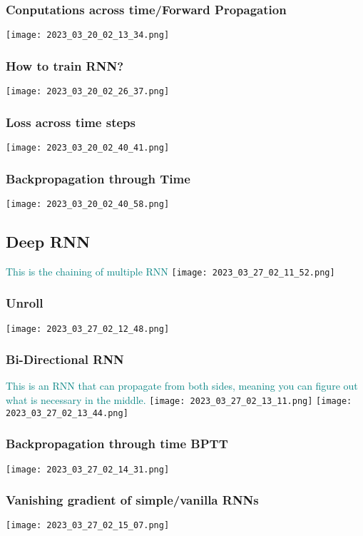 \documentclass[main.tex,fontsize=8pt,paper=a4,paper=portrait,DIV=calc,]{scrartcl}
\begin{document}
\subsubsection{Conputations across time/Forward Propagation}
\texttt{[image: 2023\_03\_20\_02\_13\_34.png]}
\subsubsection{How to train RNN?}
\texttt{[image: 2023\_03\_20\_02\_26\_37.png]}
\subsubsection{Loss across time steps}
\texttt{[image: 2023\_03\_20\_02\_40\_41.png]}
\subsubsection{Backpropagation through Time}
\texttt{[image: 2023\_03\_20\_02\_40\_58.png]}


\subsection{Deep RNN}
\textcolor{teal}{This is the chaining of multiple RNN}\newline
\texttt{[image: 2023\_03\_27\_02\_11\_52.png]}
\subsubsection{Unroll}
\texttt{[image: 2023\_03\_27\_02\_12\_48.png]}
\subsubsection{Bi-Directional RNN}
\textcolor{teal}{This is an RNN that can propagate from both sides, meaning you can figure out what is necessary in the middle.}\newline
\texttt{[image: 2023\_03\_27\_02\_13\_11.png]}\newline
\texttt{[image: 2023\_03\_27\_02\_13\_44.png]}
\subsubsection{Backpropagation through time BPTT}
\texttt{[image: 2023\_03\_27\_02\_14\_31.png]}
\subsubsection{Vanishing gradient of simple/vanilla RNNs}
\texttt{[image: 2023\_03\_27\_02\_15\_07.png]}
\end{document}
